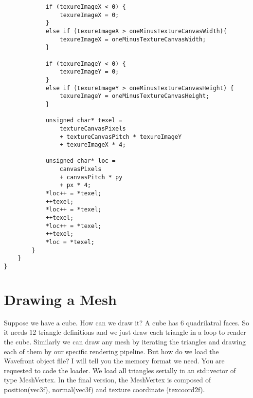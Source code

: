 \begin{lstlisting}
			if (texureImageX < 0) {
				texureImageX = 0;
			}
			else if (texureImageX > oneMinusTextureCanvasWidth){
				texureImageX = oneMinusTextureCanvasWidth;
			}

			if (texureImageY < 0) {
				texureImageY = 0;
			}
			else if (texureImageY > oneMinusTextureCanvasHeight) {
				texureImageY = oneMinusTextureCanvasHeight;
			}

			unsigned char* texel =
				textureCanvasPixels
				+ textureCanvasPitch * texureImageY
				+ texureImageX * 4;
							
			unsigned char* loc =
				canvasPixels
				+ canvasPitch * py
				+ px * 4;
			*loc++ = *texel;
			++texel;
			*loc++ = *texel;
			++texel;
			*loc++ = *texel;
			++texel;
			*loc = *texel;
		}
	}
}
\end{lstlisting}
\section{Drawing a Mesh}
Suppose we have a cube. How can we draw it? A cube has 6 quadrilatral faces. So it needs 12 triangle definitions and we just draw each triangle in a loop to render the cube. Similarly we can draw any mesh by iterating the triangles and drawing each of them by our specific rendering pipeline. But how do we load the Wavefront object file? I will tell you the memory format we need. You are requested to code the loader. We load all triangles serially in an std::vector of type  MeshVertex. In the final version, the MeshVertex is composed of position(vec3f), normal(vec3f) and texture coordinate (texcoord2f).

\clearpage